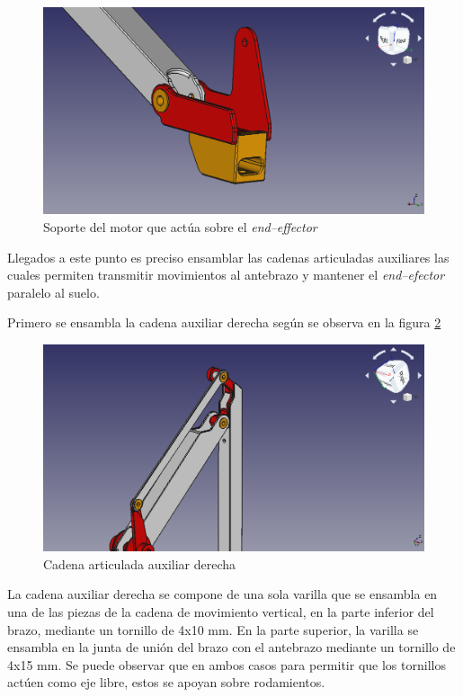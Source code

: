 \begin{figure}[H]
    \centering 
    \includegraphics[width=1\linewidth]{pictures/SujecionMotorFinal.png}
    \caption{Soporte del motor que actúa sobre el \textit{end--effector}}
    \label{fig:soporte_motor}
\end{figure}

Llegados a este punto es preciso ensamblar las cadenas articuladas auxiliares las cuales permiten transmitir movimientos al antebrazo y mantener el \textit{end--efector} paralelo al suelo.

Primero se ensambla la cadena auxiliar derecha según se observa en la figura \ref{fig:auxiliar_derecha}

\begin{figure}[H]
    \centering 
    \includegraphics[width=1\linewidth]{pictures/CadenaArticuladaDerecha.png}
    \caption{Cadena articulada auxiliar derecha}
    \label{fig:auxiliar_derecha}
\end{figure}

La cadena auxiliar derecha se compone de una sola varilla que se ensambla en una de las piezas de la cadena de movimiento vertical, en la parte inferior del brazo, mediante un tornillo de 4x10 mm. En la parte superior, la varilla se ensambla en la junta de unión del brazo con el antebrazo mediante un tornillo de 4x15 mm. Se puede observar que en ambos casos para permitir que los tornillos actúen como eje libre, estos se apoyan sobre rodamientos.

